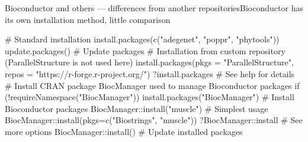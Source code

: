 \documentclass[compress, xelatex, 11pt, xcolor=svgnames, aspectratio=169, url={hyphens, lowtilde}]{beamer}
\begin{document}
\begin{frame}[fragile]{Bioconductor and others --- differences from another repositories}{Bioconductor has its own installation method, little comparison}
	\label{sources-diff}
	\begin{spluscode}
    # Standard installation
    install.packages(c("adegenet", "poppr", "phytools"))
    update.packages() # Update packages
    # Installation from custom repository (ParallelStructure is not used here)
    install.packages(pkgs = "ParallelStructure",
      repos = "https://r-forge.r-project.org/")
    ?install.packages # See help for details
    # Install CRAN package BiocManager used to manage Bioconductor packages
    if (!requireNamespace("BiocManager")) install.packages("BiocManager")
    # Install Bioconductor packages
    BiocManager::install("muscle") # Simplest usage
    BiocManager::install(pkgs=c("Biostrings", "muscle"))
    ?BiocManager::install # See more options
    BiocManager::install() # Update installed packages
	\end{spluscode}
\end{frame}
\end{document}

